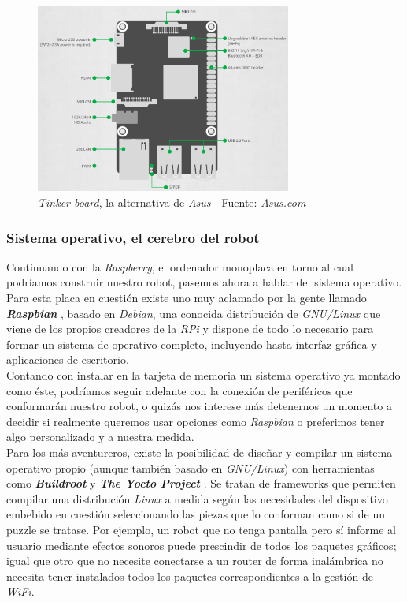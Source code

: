 \begin{figure}[h]
	\centering
	\includegraphics[width=0.75\textwidth]{imagenes/asus-tinker-conexiones.png}
	\caption{\textit{Tinker board}, la alternativa de \textit{Asus} - Fuente: \textit{Asus.com} \cite{asus-tinker}}
\end{figure}


\subsubsection{Sistema operativo, el cerebro del robot}

Continuando con la \textit{Raspberry}, el ordenador monoplaca en torno al cual podríamos construir nuestro robot, pasemos ahora a hablar del sistema operativo. Para esta placa en cuestión existe uno muy aclamado por la gente llamado \textbf{\textit{Raspbian}} \cite{raspbian}, basado en \textit{Debian}, una conocida distribución de \textit{GNU/Linux} que viene de los propios creadores de la \textit{RPi} y dispone de todo lo necesario para formar un sistema de operativo completo, incluyendo hasta interfaz gráfica y aplicaciones de escritorio.\\

Contando con instalar en la tarjeta de memoria un sistema operativo ya montado como éste, podríamos seguir adelante con la conexión de periféricos que conformarán nuestro robot, o quizás nos interese más detenernos un momento a decidir si realmente queremos usar opciones como \textit{Raspbian} o preferimos tener algo personalizado y a nuestra medida.\\

Para los más aventureros, existe la posibilidad de diseñar y compilar un sistema operativo propio (aunque también basado en \textit{GNU/Linux}) con herramientas como \textbf{\textit{Buildroot}} \cite{buildroot} y \textbf{\textit{The Yocto Project}} \cite{yocto-project}. Se tratan de frameworks que permiten compilar una distribución \textit{Linux} a medida según las necesidades del dispositivo embebido en cuestión seleccionando las piezas que lo conforman como si de un puzzle se tratase. Por ejemplo, un robot que no tenga pantalla pero sí informe al usuario mediante efectos sonoros puede prescindir de todos los paquetes gráficos; igual que otro que no necesite conectarse a un router de forma inalámbrica no necesita tener instalados todos los paquetes correspondientes a la gestión de \textit{WiFi}.\\

